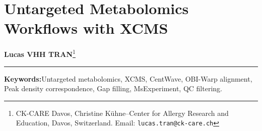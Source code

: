 \documentclass[11pt,twoside,openright]{book}
\begin{document}
\setcounter{chapter}{16}
\chapter{Untargeted Metabolomics Workflows with XCMS}
\label{chap:metabolomics_pipelines}

\noindent
\textbf{Lucas VHH TRAN}\footnote{CK-CARE Davos, Christine K\"uhne--Center for Allergy Research and Education, Davos, Switzerland. Email: \texttt{lucas.tran@ck-care.ch}}\\
\rule{\textwidth}{0.8pt}

\begin{abstract}
\noindent
Untargeted metabolomics transforms raw liquid chromatography--mass spectrometry (LC-MS) time-series into aligned feature abundance matrices through a sequential dependency chain: peak detection, retention time alignment, correspondence grouping, and gap filling \cite{smith2006xcms, theodoridis2018metabolic}. Errors introduced during initial peak picking propagate multiplicatively into downstream statistical testing: missed peaks create artificial missingness, misaligned retention times split single chemical compounds into duplicate features, and unmodeled adducts inflate false discovery rates. The modern R and Bioconductor architecture unifies raw spectral data and experimental design metadata inside \texttt{MsExperiment} containers \cite{rainer2022msexperiment}. Peak detection using continuous wavelet transform ridges (\texttt{CentWaveParam}) extracts chromatographic boundaries \cite{tautenhahn2008centwave}, non-linear ordered bijective warping (\texttt{ObiwarpParam}) eliminates column drift across analytical runs \cite{prince2006obiwarp, mahieu2016warping}, and peak density correspondence (\texttt{PeakDensityParam}) defines consensus feature definitions \cite{smith2006xcms}. Gap filling (\texttt{fillChromPeaks}) integrates raw baseline currents in missing channels, cutting matrix sparsity by nearly half. This chapter presents the complete mathematical formulation, parameter sensitivity constraints, and laboratory execution of the \texttt{xcms} 4.10 pipeline on the \texttt{faahKO} cohort \cite{cravatt2001faah, saghatelian2004activity} in R 4.6.1.
\end{abstract}

\vspace{1em}
\noindent\textbf{Keywords:}\enspace Untargeted metabolomics, XCMS, CentWave, OBI-Warp alignment, Peak density correspondence, Gap filling, MsExperiment, QC filtering.
\end{document}
